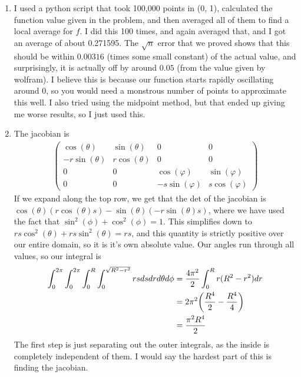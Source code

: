 \documentclass[12pt]{article}
\theoremstyle{definition}
\theoremstyle{remark}
\begin{document}
\begin{enumerate}[leftmargin=\labelsep]
		\item I used a python script that took 100,000 points in (0, 1), calculated the function value given in the problem, and then averaged all of them to find a local average for $f$. I did this 100 times, and again averaged that, and I got an average of about 0.271595. The $\sqrt{n}$ error that we proved shows that this should be within $0.00316$ (times some small constant) of the actual value, and surprisingly, it is actually off by around $0.05$ (from the value given by wolfram). I believe this is because our function starts rapidly oscillating around 0, so you would need a monstrous number of points to approximate this well. I also tried using the midpoint method, but that ended up giving me worse results, so I just used this.
		
		\item The jacobian is \begin{align*}
			\begin{pmatrix}
				\cos(\theta) & \sin(\theta) & 0 & 0 \\
				-r\sin(\theta) & r\cos(\theta) & 0 & 0 \\
				0 & 0 & \cos(\varphi) & \sin(\varphi) \\
				0 & 0 & -s\sin(\varphi) & s\cos(\varphi) 
			\end{pmatrix}
		\end{align*} If we expand along the top row, we get that the det of the jacobian is $\cos(\theta)(r\cos(\theta)s)-\sin(\theta)(-r\sin(\theta)s)$, where we have used the fact that $\sin^2(\phi) + \cos^2(\phi) = 1$. This simplifies down to $rs\cos^2(\theta)+rs\sin^2(\theta) = rs$, and this quantity is strictly positive over our entire domain, so it is it's own absolute value. Our angles run through all values, so our integral is
		\begin{align*}
			\int_0^{2\pi} \int_0^{2\pi} \int_0^R \int_0^{\sqrt{R^2-r^2}} rs dsdrd\theta d\phi &= \frac{4\pi^2}2 \int_0^R  r(R^2-r^2) dr \\
			&= 2\pi^2 \qty(\frac {R^4}2 - \frac {R^4}4) \\
			&= \frac{\pi^2 R^4}2
		\end{align*}
		The first step is just separating out the outer integrals, as the inside is completely independent of them. I would say the hardest part of this is finding the jacobian.
		

\end{enumerate}
\end{document}
